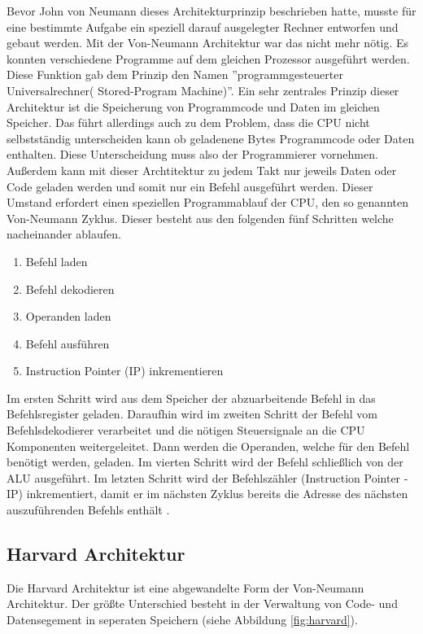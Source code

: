 \documentclass[12pt]{article}
\begin{document}
\noindent Bevor John von Neumann dieses Architekturprinzip beschrieben hatte, musste für eine bestimmte Aufgabe ein speziell darauf ausgelegter Rechner entworfen und gebaut werden. Mit der Von-Neumann Architektur war das nicht mehr nötig. Es konnten verschiedene Programme auf dem gleichen Prozessor ausgeführt werden. Diese Funktion gab dem Prinzip den Namen ''programmgesteuerter Universalrechner( Stored-Program Machine)''\cite{TaschenbuchMikroprozessortechnik}.
Ein sehr zentrales Prinzip dieser Architektur ist die Speicherung von Programmcode und Daten im gleichen Speicher. Das führt allerdings auch zu dem Problem, dass die CPU nicht selbstständig unterscheiden kann ob geladenene Bytes Programmcode oder Daten enthalten. Diese Unterscheidung muss also der Programmierer vornehmen. Außerdem kann mit dieser Archtitektur zu jedem Takt nur jeweils Daten oder Code geladen werden und somit nur ein Befehl ausgeführt werden. Dieser Umstand erfordert einen speziellen Programmablauf der CPU, den so genannten Von-Neumann Zyklus. Dieser besteht aus den folgenden fünf Schritten welche nacheinander ablaufen.
\begin{enumerate}
\item Befehl laden 
\item Befehl dekodieren
\item Operanden laden
\item Befehl ausführen
\item Instruction Pointer (IP) inkrementieren
\end{enumerate}
Im ersten Schritt wird aus dem Speicher der abzuarbeitende Befehl in das Befehlsregister geladen. Daraufhin wird im zweiten Schritt der Befehl vom Befehlsdekodierer verarbeitet und die nötigen Steuersignale an die CPU Komponenten weitergeleitet. Dann werden die Operanden, welche für den Befehl benötigt werden, geladen. Im vierten Schritt wird der Befehl schließlich von der ALU ausgeführt. Im letzten Schritt wird der Befehlszähler (Instruction Pointer - IP) inkrementiert, damit er im nächsten Zyklus bereits die Adresse des nächsten auszuführenden Befehls enthält \cite{unikoelnvnz}.
\subsection{Harvard Architektur} 
Die Harvard Architektur ist eine abgewandelte Form der Von-Neumann Architektur. Der größte Unterschied besteht in der Verwaltung von Code- und Datensegement in seperaten Speichern (siehe Abbildung \ref{fig:harvard}).
\end{document}
